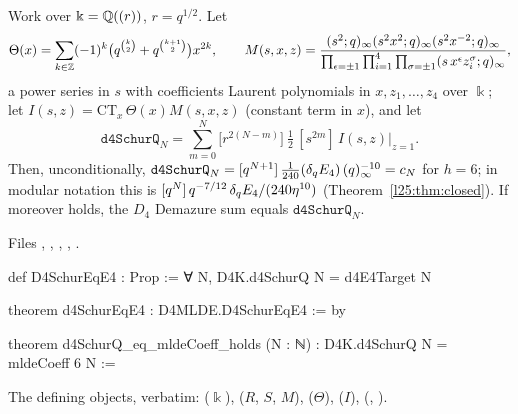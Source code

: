 \begin{theorem}[$D_4$: the series \lean{d4SchurQ} $=$ MLDE solution; Demazure $=$ \lean{d4SchurQ} under positivity]\label{l25:thm:d4}
Work over $\Bbbk={\mathbb{Q}}((r))$, $r=q^{1/2}$. Let
\begin{equation*}
\Theta(x)=\sum_{k\in{\mathbb{Z}}}(-1)^k\big(q^{\binom k2}+q^{\binom{k+1}2}\big)x^{2k},\qquad
M(s,x,z)=\frac{(s^2;q)_\infty(s^2x^2;q)_\infty(s^2x^{-2};q)_\infty}
{\prod_{\epsilon=\pm1}\prod_{i=1}^4\prod_{\sigma=\pm1}(s\,x^\epsilon z_i^\sigma;q)_\infty},
\end{equation*}
a power series in $s$ with coefficients Laurent polynomials in $x,z_1,\dots,z_4$ over $\Bbbk$; let
$I(s,z)=\mathrm{CT}_x\,\Theta(x)M(s,x,z)$ (constant term in $x$), and let
\begin{equation*}
\mathtt{d4SchurQ}_N=\sum_{m=0}^{N}\Big[r^{2(N-m)}\Big]\ \tfrac12\,[s^{2m}]\,I(s,z)\big|_{z=1}.
\end{equation*}
Then, unconditionally, $\mathtt{d4SchurQ}_N=[q^{N+1}]\,\frac1{240}(\delta_q E_4)\,(q)_\infty^{-10}=c_N$ for $h=6$; in
modular notation this is $[q^N]\,q^{-7/12}\,\delta_q E_4/(240\eta^{10})$ (Theorem~\ref{l25:thm:closed}). If moreover
 holds, the $D_4$ Demazure sum equals $\mathtt{d4SchurQ}_N$.
\end{theorem}
\noindent Files ,
, , ,
.
\begin{leancode}
def D4SchurEqE4 : Prop := ∀ N, D4K.d4SchurQ N = d4E4Target N

theorem d4SchurEqE4 : D4MLDE.D4SchurEqE4 := by

theorem d4SchurQ_eq_mldeCoeff_holds (N : ℕ) : D4K.d4SchurQ N = mldeCoeff 6 N :=
\end{leancode}
\noindent The defining objects, verbatim: 
($\Bbbk$),  ($R$, $S$, $M$), 
($\Theta$),  ($I$),  (,
).
